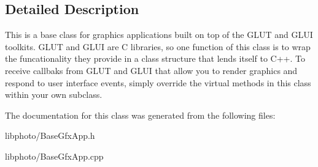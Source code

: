 \subsection{Detailed Description}
This is a base class for graphics applications built on top of the G\+L\+UT and G\+L\+UI toolkits. G\+L\+UT and G\+L\+UI are C libraries, so one function of this class is to wrap the funcationality they provide in a class structure that lends itself to C++. To receive callbaks from G\+L\+UT and G\+L\+UI that allow you to render graphics and respond to user interface events, simply override the virtual methods in this class within your own subclass. 

The documentation for this class was generated from the following files\+:\begin{DoxyCompactItemize}
\item 
libphoto/Base\+Gfx\+App.\+h\item 
libphoto/Base\+Gfx\+App.\+cpp\end{DoxyCompactItemize}
